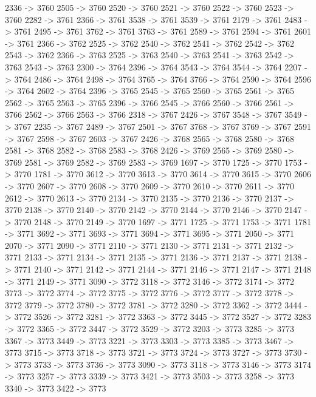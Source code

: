 {	2336 -> 3760
	2505 -> 3760
	2520 -> 3760
	2521 -> 3760
	2522 -> 3760
	2523 -> 3760
	2282 -> 3761
	2366 -> 3761
	3538 -> 3761
	3539 -> 3761
	2179 -> 3761
	2483 -> 3761
	2495 -> 3761
	3762 -> 3761
	3763 -> 3761
	2589 -> 3761
	2594 -> 3761
	2601 -> 3761
	2366 -> 3762
	2525 -> 3762
	2540 -> 3762
	2541 -> 3762
	2542 -> 3762
	2543 -> 3762
	2366 -> 3763
	2525 -> 3763
	2540 -> 3763
	2541 -> 3763
	2542 -> 3763
	2543 -> 3763
	2300 -> 3764
	2396 -> 3764
	3543 -> 3764
	3544 -> 3764
	2207 -> 3764
	2486 -> 3764
	2498 -> 3764
	3765 -> 3764
	3766 -> 3764
	2590 -> 3764
	2596 -> 3764
	2602 -> 3764
	2396 -> 3765
	2545 -> 3765
	2560 -> 3765
	2561 -> 3765
	2562 -> 3765
	2563 -> 3765
	2396 -> 3766
	2545 -> 3766
	2560 -> 3766
	2561 -> 3766
	2562 -> 3766
	2563 -> 3766
	2318 -> 3767
	2426 -> 3767
	3548 -> 3767
	3549 -> 3767
	2235 -> 3767
	2489 -> 3767
	2501 -> 3767
	3768 -> 3767
	3769 -> 3767
	2591 -> 3767
	2598 -> 3767
	2603 -> 3767
	2426 -> 3768
	2565 -> 3768
	2580 -> 3768
	2581 -> 3768
	2582 -> 3768
	2583 -> 3768
	2426 -> 3769
	2565 -> 3769
	2580 -> 3769
	2581 -> 3769
	2582 -> 3769
	2583 -> 3769
	1697 -> 3770
	1725 -> 3770
	1753 -> 3770
	1781 -> 3770
	3612 -> 3770
	3613 -> 3770
	3614 -> 3770
	3615 -> 3770
	2606 -> 3770
	2607 -> 3770
	2608 -> 3770
	2609 -> 3770
	2610 -> 3770
	2611 -> 3770
	2612 -> 3770
	2613 -> 3770
	2134 -> 3770
	2135 -> 3770
	2136 -> 3770
	2137 -> 3770
	2138 -> 3770
	2140 -> 3770
	2142 -> 3770
	2144 -> 3770
	2146 -> 3770
	2147 -> 3770
	2148 -> 3770
	2149 -> 3770
	1697 -> 3771
	1725 -> 3771
	1753 -> 3771
	1781 -> 3771
	3692 -> 3771
	3693 -> 3771
	3694 -> 3771
	3695 -> 3771
	2050 -> 3771
	2070 -> 3771
	2090 -> 3771
	2110 -> 3771
	2130 -> 3771
	2131 -> 3771
	2132 -> 3771
	2133 -> 3771
	2134 -> 3771
	2135 -> 3771
	2136 -> 3771
	2137 -> 3771
	2138 -> 3771
	2140 -> 3771
	2142 -> 3771
	2144 -> 3771
	2146 -> 3771
	2147 -> 3771
	2148 -> 3771
	2149 -> 3771
	3090 -> 3772
	3118 -> 3772
	3146 -> 3772
	3174 -> 3772
	3773 -> 3772
	3774 -> 3772
	3775 -> 3772
	3776 -> 3772
	3777 -> 3772
	3778 -> 3772
	3779 -> 3772
	3780 -> 3772
	3781 -> 3772
	3280 -> 3772
	3362 -> 3772
	3444 -> 3772
	3526 -> 3772
	3281 -> 3772
	3363 -> 3772
	3445 -> 3772
	3527 -> 3772
	3283 -> 3772
	3365 -> 3772
	3447 -> 3772
	3529 -> 3772
	3203 -> 3773
	3285 -> 3773
	3367 -> 3773
	3449 -> 3773
	3221 -> 3773
	3303 -> 3773
	3385 -> 3773
	3467 -> 3773
	3715 -> 3773
	3718 -> 3773
	3721 -> 3773
	3724 -> 3773
	3727 -> 3773
	3730 -> 3773
	3733 -> 3773
	3736 -> 3773
	3090 -> 3773
	3118 -> 3773
	3146 -> 3773
	3174 -> 3773
	3257 -> 3773
	3339 -> 3773
	3421 -> 3773
	3503 -> 3773
	3258 -> 3773
	3340 -> 3773
	3422 -> 3773
}
